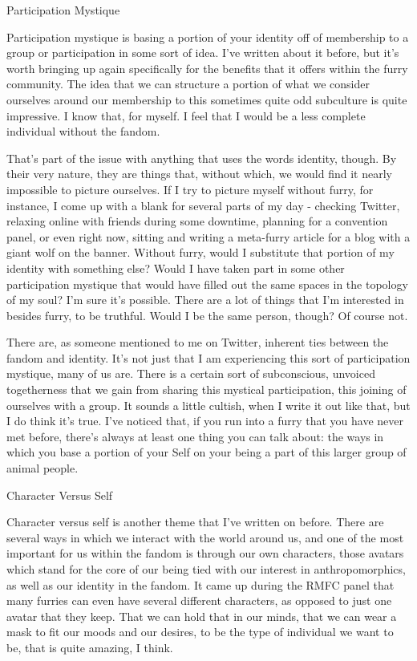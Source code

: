 Participation Mystique

Participation mystique is basing a portion of your identity off of membership to a group or participation in some sort of idea. I've written about it before, but it's worth bringing up again specifically for the benefits that it offers within the furry community. The idea that we can structure a portion of what we consider ourselves around our membership to this sometimes quite odd subculture is quite impressive. I know that, for myself. I feel that I would be a less complete individual without the fandom.

That's part of the issue with anything that uses the words identity, though. By their very nature, they are things that, without which, we would find it nearly impossible to picture ourselves. If I try to picture myself without furry, for instance, I come up with a blank for several parts of my day - checking Twitter, relaxing online with friends during some downtime, planning for a convention panel, or even right now, sitting and writing a meta-furry article for a blog with a giant wolf on the banner. Without furry, would I substitute that portion of my identity with something else? Would I have taken part in some other participation mystique that would have filled out the same spaces in the topology of my soul? I'm sure it's possible. There are a lot of things that I'm interested in besides furry, to be truthful. Would I be the same person, though? Of course not.

There are, as someone mentioned to me on Twitter, inherent ties between the fandom and identity. It's not just that I am experiencing this sort of participation mystique, many of us are. There is a certain sort of subconscious, unvoiced togetherness that we gain from sharing this mystical participation, this joining of ourselves with a group. It sounds a little cultish, when I write it out like that, but I do think it's true. I've noticed that, if you run into a furry that you have never met before, there's always at least one thing you can talk about: the ways in which you base a portion of your Self on your being a part of this larger group of animal people.

Character Versus Self

Character versus self is another theme that I've written on before. There are several ways in which we interact with the world around us, and one of the most important for us within the fandom is through our own characters, those avatars which stand for the core of our being tied with our interest in anthropomorphics, as well as our identity in the fandom. It came up during the RMFC panel that many furries can even have several different characters, as opposed to just one avatar that they keep. That we can hold that in our minds, that we can wear a mask to fit our moods and our desires, to be the type of individual we want to be, that is quite amazing, I think.

